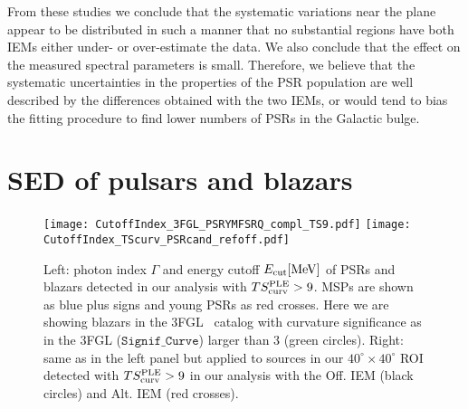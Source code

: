 \documentclass[iop]{emulateapj}
\begin{document}
From these studies we conclude that the systematic variations
  near the plane appear to be distributed in such a manner that no
  substantial regions have both IEMs either under- or over-estimate
  the data.  We also conclude that the effect on the measured spectral
  parameters is small.  Therefore, we believe that the systematic
  uncertainties in the properties of the PSR population are well
  described by the differences obtained with the two IEMs, or would
  tend to bias the fitting procedure to find lower numbers of PSRs in
  the Galactic bulge.





\section{SED of pulsars and blazars} 
\label{sec:psrblazar}

\begin{figure*}
	\centering
\texttt{[image: CutoffIndex\_3FGL\_PSRYMFSRQ\_compl\_TS9.pdf]}
\texttt{[image: CutoffIndex\_TScurv\_PSRcand\_refoff.pdf]}
\caption{Left: photon index $\Gamma$ and energy cutoff
  $E_{\rm{cut}}[\rm{MeV}]$ of PSRs and blazars detected 
  in our analysis with $TS^{\rm{PLE}}_{\rm{curv}}>9$. MSPs are shown
  as blue plus signs and young PSRs as red crosses. Here we are showing blazars in the
  3FGL~\citep{2015ApJS..218...23A} catalog with curvature significance as in
  the 3FGL ($\texttt{Signif\_Curve}$) larger than 3 (green circles).
  Right: same as in the left panel but applied to sources in our $40^{\circ}\times40^{\circ}$ ROI
  detected with $TS^{\rm{PLE}}_{\rm{curv}}>9$ in our analysis with the
  Off. IEM (black circles) and Alt. IEM (red crosses).}
\label{fig:psrblazar} 
\end{figure*}
\end{document}
